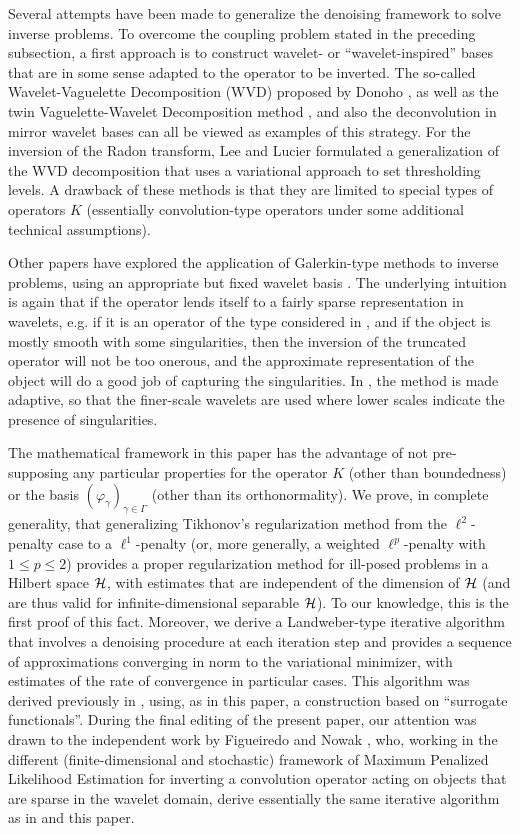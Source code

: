 \documentclass[10pt]{article}
\def\vpg{\varphi_{\gamma}}
\begin{document}
Several attempts have been made to generalize the denoising framework
to solve inverse problems. To overcome the coupling problem stated in the
preceding subsection, a first approach is to construct wavelet- or
``wavelet-inspired'' bases that are in some sense adapted to the operator to
be inverted. The so-called Wavelet-Vaguelette
Decomposition (WVD) proposed by Donoho \cite{Don95}, as well as the twin
Vaguelette-Wavelet Decomposition method \cite{Abr98}, and also the
deconvolution in mirror wavelet bases \cite{KMR03, Mal98} can all be
viewed as examples of this strategy. For the inversion of the Radon transform,
Lee and Lucier \cite{Lee01} formulated a
generalization of the WVD decomposition that uses a variational
approach to set thresholding levels. A drawback
of these methods is that they are limited to special types of operators $K$
(essentially convolution-type operators under some additional
technical assumptions).

Other papers have explored the application of Galerkin-type methods to inverse
problems, using an appropriate but fixed wavelet basis \cite{Dic96, Lou97,
Coh02}. The underlying intuition is again that if the operator lends itself
to a
fairly  sparse representation in wavelets, e.g. if it is an operator of the
type
considered in \cite{Bey91}, and if the object is mostly smooth with some
singularities, then the inversion of the truncated operator will not be too
onerous, and the approximate representation of the object will do a good
job of
capturing the singularities. In \cite{Coh02}, the method is made
adaptive, so that
the finer-scale wavelets are used where lower scales indicate the presence of
singularities.

The mathematical framework in this paper has the advantage of not
pre-supposing any
particular properties for the operator $K$ (other than boundedness) or the
basis
$(\vpg)_{\gamma\in \Gamma}$ (other than its orthonormality). We prove,
in complete
generality, that generalizing Tikhonov's regularization method from the
$\ell^2$-penalty case to a $\ell^1$-penalty (or, more generally, a weighted
$\ell^p$-penalty with $1\leq p\leq 2$) provides a proper regularization
method for
ill-posed problems in a Hilbert space $\cal H$, with estimates that are
independent
of the dimension of $\cal H$ (and are thus valid for infinite-dimensional
separable $\cal H$). To our knowledge, this is the first proof of this fact.
Moreover, we derive a Landweber-type iterative algorithm that involves a
denoising procedure at each iteration step and provides a sequence of
approximations
converging in norm to the variational minimizer, with estimates of the rate of
convergence in particular cases. This algorithm was derived previously
in \cite{DeM02}, using,
as in this paper, a construction based on ``surrogate
functionals''. During the final editing of the present paper, our attention
was
drawn to the independent work by Figueiredo and Nowak \cite{Fig03, Nov01},
who, working in the different (finite-dimensional
and stochastic) framework of Maximum Penalized
Likelihood Estimation
for inverting a
convolution operator acting on objects that are sparse in the wavelet domain,
derive essentially the same iterative algorithm as in \cite{DeM02} and
this paper.
\end{document}
